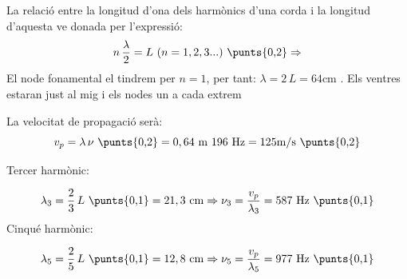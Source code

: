 \begin{solapartat}
La relació entre la longitud d'ona dels harmònics d'una corda i la longitud d'aquesta ve donada per l'expressió:
\[ n\,\frac{\lambda}{2} = L\ (n = 1, 2, 3...) \ \text{\punts{0,2}} \Rightarrow \]
El node fonamental el tindrem per $n = 1$, per tant: $\lambda = 2\,L = 64\mathrm{cm}$ . Els ventres estaran just al mig i els nodes un a cada extrem 

La velocitat de propagació serà:
\[ v_p = \lambda\,\nu \ \text{\punts{0,2}} = 0,64\ \mathrm{m}\ 196\ \mathrm{Hz} = 125\mathrm{m/s} \ \text{\punts{0,2}} \]
\end{solapartat}

\begin{solapartat}
Tercer harmònic:

\[ \lambda_3 = \frac{2}{3}\,L \ \text{\punts{0,1}} = 21,3\ \mathrm{cm} \Rightarrow \nu_3 = \frac{v_p}{\lambda_3} = 587\ \mathrm{Hz} \ \text{\punts{0,1}} \]
Cinqué harmònic:

\[ \lambda_5 = \frac{2}{5}\,L \ \text{\punts{0,1}} = 12,8\ \mathrm{cm} \Rightarrow \nu_5 = \frac{v_p}{\lambda_5} = 977\ \mathrm{Hz} \ \text{\punts{0,1}} \]
\end{solapartat}
